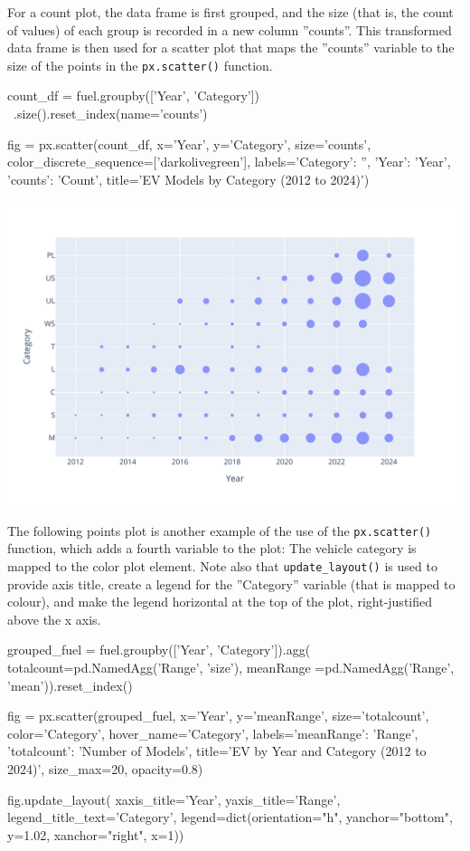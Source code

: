 For a count plot, the data frame is first grouped, and the size (that is, the count of values) of each group is recorded in a new column ''counts''. This transformed data frame is then used for a scatter plot that maps the ''counts'' variable to the size of the points in the \texttt{px.scatter()} function.

\begin{samepage}
\begin{pythoncode}
count_df = fuel.groupby(['Year', 'Category']) \
   .size().reset_index(name='counts')

fig = px.scatter(count_df, 
   x='Year', y='Category', size='counts',
   color_discrete_sequence=['darkolivegreen'],
   labels={'Category': '', 'Year': 'Year', 'counts': 'Count'},
   title='EV Models by Category (2012 to 2024)')
\end{pythoncode}
\end{samepage}

\begin{center}
  \includegraphics[width=.8\textwidth]{px.fuel.count.pdf}
\end{center}

The following points  plot is another example of the use of the \texttt{px.scatter()} function, which adds a fourth variable to the plot: The vehicle category is mapped to the color plot element. Note also that \texttt{update\_layout()} is used to provide axis title, create a legend for the ''Category'' variable (that is mapped to colour), and make the legend horizontal at the top of the plot, right-justified above the x axis.

\begin{samepage}
\begin{pythoncode}
grouped_fuel = fuel.groupby(['Year', 'Category']).agg(
    totalcount=pd.NamedAgg('Range', 'size'),
    meanRange =pd.NamedAgg('Range', 'mean')).reset_index()

fig = px.scatter(grouped_fuel, 
    x='Year', y='meanRange', size='totalcount', 
    color='Category', hover_name='Category', 
    labels={'meanRange': 'Range', 'totalcount': 'Number of Models'},
    title='EV by Year and Category (2012 to 2024)',
    size_max=20, opacity=0.8)

fig.update_layout(
    xaxis_title='Year',
    yaxis_title='Range',
    legend_title_text='Category',
    legend=dict(orientation="h", yanchor="bottom", 
                y=1.02, xanchor="right", x=1))
\end{pythoncode}
\end{samepage}

